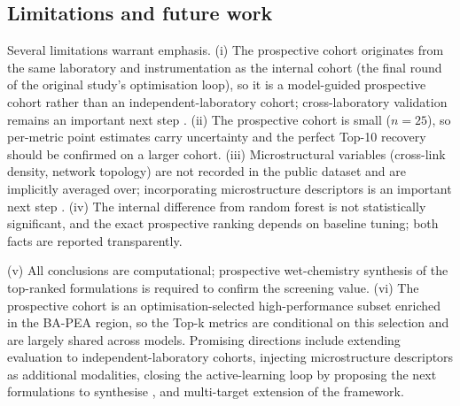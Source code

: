 \subsection{Limitations and future work}

Several limitations warrant emphasis. (i) The prospective cohort originates from the same laboratory and instrumentation as the internal cohort (the final round of the original study's optimisation loop), so it is a model-guided prospective cohort rather than an independent-laboratory cohort; cross-laboratory validation remains an important next step \cite{liao2025nature}. (ii) The prospective cohort is small ($n = 25$), so per-metric point estimates carry uncertainty and the perfect Top-10 recovery should be confirmed on a larger cohort. (iii) Microstructural variables (cross-link density, network topology) are not recorded in the public dataset and are implicitly averaged over; incorporating microstructure descriptors is an important next step \cite{kim2023smallML,agrawal2016mlmaterials,isayev2017mlmaterials,zitnick2020materials}. (iv) The internal difference from random forest is not statistically significant, and the exact prospective ranking depends on baseline tuning; both facts are reported transparently.

(v) All conclusions are computational; prospective wet-chemistry synthesis of the top-ranked formulations is required to confirm the screening value. (vi) The prospective cohort is an optimisation-selected high-performance subset enriched in the BA-PEA region, so the Top-k metrics are conditional on this selection and are largely shared across models. Promising directions include extending evaluation to independent-laboratory cohorts, injecting microstructure descriptors as additional modalities, closing the active-learning loop by proposing the next formulations to synthesise \cite{chen2022activelearning}, and multi-target extension of the framework.
